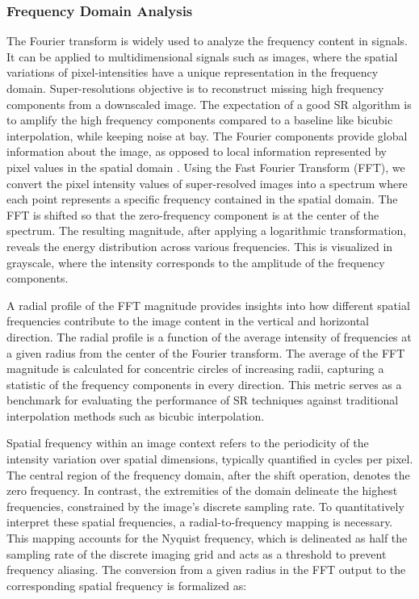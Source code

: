        \subsubsection{Frequency Domain Analysis} \label{subsubsec:frequency_domain_analysis}
        
        The Fourier transform is widely used to analyze the frequency content in signals.
        It can be applied to multidimensional signals such as images, where the spatial variations of pixel-intensities have a unique representation in the frequency domain. 
        Super-resolutions objective is to reconstruct missing high frequency components from a downscaled image.
        The expectation of a good SR algorithm is to amplify the high frequency components compared to a baseline like bicubic interpolation, while keeping noise at bay.
        The Fourier components provide global information about the image, as opposed to local information represented by pixel values in the spatial domain \cite{fuoli2021fourier}. 
        Using the Fast Fourier Transform (FFT), we convert the pixel intensity values of super-resolved images into a spectrum where each point represents a specific frequency contained in the spatial domain.
        The FFT is shifted so that the zero-frequency component is at the center of the spectrum. 
        The resulting magnitude, after applying a logarithmic transformation, reveals the energy distribution across various frequencies.
        This is visualized in grayscale, where the intensity corresponds to the amplitude of the frequency components.
        
        A radial profile of the FFT magnitude provides insights into how different spatial frequencies contribute to the image content in the vertical and horizontal direction.
        The radial profile is a function of the average intensity of frequencies at a given radius from the center of the Fourier transform.
        The average of the FFT magnitude is calculated for concentric circles of increasing radii, capturing a statistic of the frequency components in every direction.
        This metric serves as a benchmark for evaluating the performance of SR techniques against traditional interpolation methods such as bicubic interpolation.
        
        Spatial frequency within an image context refers to the periodicity of the intensity variation over spatial dimensions, typically quantified in cycles per pixel. The central region of the frequency domain, after the shift operation, denotes the zero frequency. In contrast, the extremities of the domain delineate the highest frequencies, constrained by the image's discrete sampling rate.
        To quantitatively interpret these spatial frequencies, a radial-to-frequency mapping is necessary. This mapping accounts for the Nyquist frequency, which is delineated as half the sampling rate of the discrete imaging grid and acts as a threshold to prevent frequency aliasing.
        The conversion from a given radius in the FFT output to the corresponding spatial frequency is formalized as:

